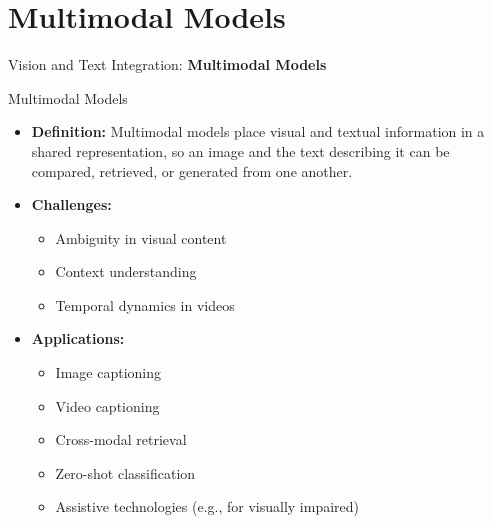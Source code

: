 \section{Multimodal Models}
\begin{frame}{}
    \LARGE Vision and Text Integration: \textbf{Multimodal Models}
\end{frame}

\begin{frame}[allowframebreaks]{Multimodal Models}
    \begin{itemize}
        \item \textbf{Definition:} Multimodal models place visual and textual information in a shared representation, so an image and the text describing it can be compared, retrieved, or generated from one another.
        \item \textbf{Challenges:}
        \begin{itemize}
            \item Ambiguity in visual content
            \item Context understanding
            \item Temporal dynamics in videos
        \end{itemize}
    \end{itemize}
\framebreak
    \begin{itemize}
        \item \textbf{Applications:}
        \begin{itemize}
            \item Image captioning
            \item Video captioning
            \item Cross-modal retrieval
            \item Zero-shot classification
            \item Assistive technologies (e.g., for visually impaired)
        \end{itemize}
    \end{itemize}
\end{frame}

